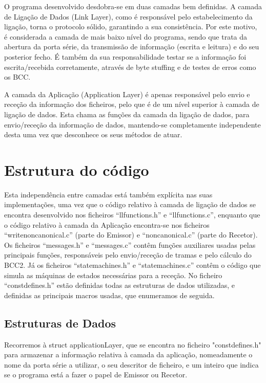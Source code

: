 \documentclass[article, a4paper, 11pt, oneside]{memoir}
\begin{document}
O programa desenvolvido desdobra-se em duas camadas bem definidas. A camada de Ligação de Dados (Link Layer), como é responsável 
pelo estabelecimento da ligação, 
torna o protocolo sólido, garantindo a sua consistência. 
Por este motivo, é considerada a camada de mais baixo nível do programa, sendo que trata da abertura da porta série, 
da transmissão de informação (escrita e leitura) e do seu posterior fecho. 
É também da sua responsabilidade testar se a informação foi escrita/recebida corretamente, através de byte stuffing e de testes de erros como os BCC.

A camada da Aplicação (Application Layer) é apenas responsável pelo envio e receção da informação dos ficheiros, pelo que é de um nível superior à camada de ligação de dados.
Esta chama as funções da camada da ligação de dados, para envio/receção da informação de dados, 
mantendo-se completamente independente desta uma vez que desconhece os seus métodos de atuar.

\chapter[Estrutura do código][Estrutura do código]{Estrutura do código} \label{\thechapter}

Esta independência entre camadas está também explícita nas suas implementações, uma vez que o código relativo à camada de ligação de dados se 
encontra desenvolvido nos ficheiros “llfunctions.h” e “llfunctions.c”, enquanto que o código relativo à camada da Aplicação encontra-se nos ficheiros 
“writenoncanonical.c” (parte do Emissor) e “noncanonical.c” (parte do Recetor). Os ficheiros “messages.h” e “messages.c” contêm funções auxiliares 
usadas pelas principais funções, responsáveis pelo envio/receção de tramas e pelo cálculo do BCC2. 
Já os ficheiros “state\textunderscore machines.h” e “state\textunderscore machines.c” contêm o código que simula as máquinas de estados necessárias para a receção.
No ficheiro “const\textunderscore defines.h” estão definidas todas as estruturas de dados utilizadas, e definidas as principais macros usadas, que enumeramos de seguida.

\section{Estruturas de Dados}
Recorremos à struct applicationLayer, que se encontra no ficheiro "const\textunderscore defines.h" para armazenar a informação relativa à camada da aplicação, nomeadamente o nome da porta série a utilizar, 
o seu descritor de ficheiro, e um inteiro que indica se o programa está a fazer o papel de Emissor ou Recetor.
\end{document}
